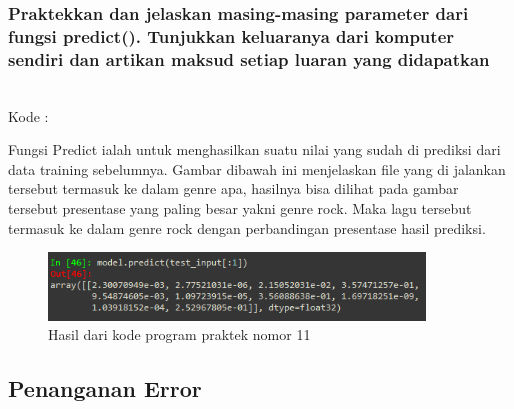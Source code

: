 \subsubsection{Praktekkan dan jelaskan masing-masing parameter dari fungsi predict(). Tunjukkan keluaranya dari komputer sendiri dan artikan maksud setiap luaran yang didapatkan}
\hfill\\
Kode :


Fungsi Predict ialah untuk menghasilkan suatu nilai yang sudah di prediksi dari data training sebelumnya. Gambar dibawah ini menjelaskan file yang di jalankan tersebut termasuk ke dalam genre apa, hasilnya bisa dilihat pada gambar tersebut presentase yang paling besar yakni genre rock. Maka lagu tersebut termasuk ke dalam genre rock dengan perbandingan presentase hasil prediksi.
\begin{figure}[H]
	\centering
	\includegraphics[width=10cm]{figures/1174083/figures6/41.png}
	\caption{Hasil dari kode program praktek nomor 11}
\end{figure}

\subsection{Penanganan Error}
